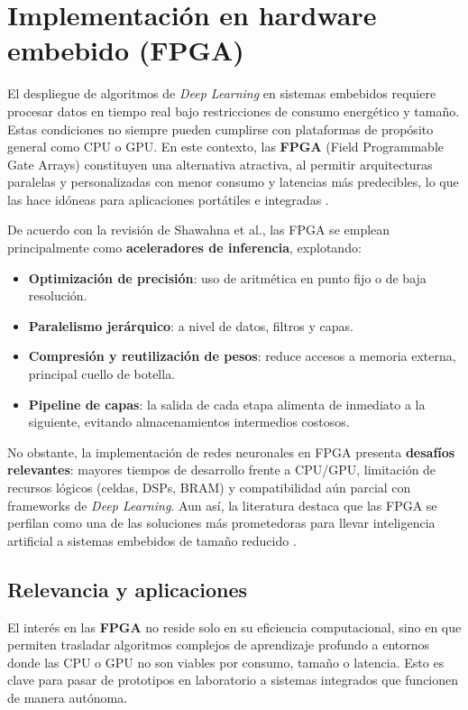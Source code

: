 \section{Implementación en hardware embebido (FPGA)}\label{sec:fpga}

El despliegue de algoritmos de \emph{Deep Learning} en sistemas embebidos requiere procesar datos en tiempo real bajo restricciones de consumo energético y tamaño.  
Estas condiciones no siempre pueden cumplirse con plataformas de propósito general como CPU o GPU.  
En este contexto, las \textbf{FPGA} (Field Programmable Gate Arrays) constituyen una alternativa atractiva, al permitir arquitecturas paralelas y personalizadas con menor consumo y latencias más predecibles, lo que las hace idóneas para aplicaciones portátiles e integradas \cite{FPGA2019}.

De acuerdo con la revisión de Shawahna et al., las FPGA se emplean principalmente como \textbf{aceleradores de inferencia}, explotando:  
\begin{itemize}
	\item \textbf{Optimización de precisión}: uso de aritmética en punto fijo o de baja resolución.  
	\item \textbf{Paralelismo jerárquico}: a nivel de datos, filtros y capas.  
	\item \textbf{Compresión y reutilización de pesos}: reduce accesos a memoria externa, principal cuello de botella.  
	\item \textbf{Pipeline de capas}: la salida de cada etapa alimenta de inmediato a la siguiente, evitando almacenamientos intermedios costosos.  
\end{itemize}

No obstante, la implementación de redes neuronales en FPGA presenta \textbf{desafíos relevantes}: mayores tiempos de desarrollo frente a CPU/GPU, limitación de recursos lógicos (celdas, DSPs, BRAM) y compatibilidad aún parcial con frameworks de \emph{Deep Learning}.  
Aun así, la literatura destaca que las FPGA se perfilan como una de las soluciones más prometedoras para llevar inteligencia artificial a sistemas embebidos de tamaño reducido \cite{FPGA2019}.


\subsection{Relevancia y aplicaciones}

El interés en las \textbf{FPGA} no reside solo en su eficiencia computacional, 
sino en que permiten trasladar algoritmos complejos de aprendizaje profundo a entornos donde 
las CPU o GPU no son viables por consumo, tamaño o latencia.  
Esto es clave para pasar de prototipos en laboratorio a sistemas integrados que funcionen de manera autónoma.

